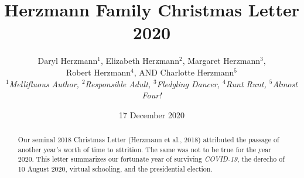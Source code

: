 \documentclass[letterpaper,11pt]{article}
\title{\vspace{-2.0cm}Herzmann Family Christmas Letter 2020}
\author{Daryl Herzmann${}^1$, Elizabeth Herzmann${}^2$, Margaret 
Herzmann${}^3$,\\
Robert Herzmann${}^4$, AND Charlotte Herzmann${}^5$ \\
\it{${}^1$Mellifluous Author},
\it{${}^2$Responsible Adult},
\it{${}^3$Fledgling Dancer},
\it{${}^4$Runt Runt},
\it{${}^5$Almost Four!}}
\date{17 December 2020}
\begin{document}
\maketitle
\vspace{-0.75cm}
\begin{abstract}
Our seminal 2018 Christmas Letter (Herzmann et al., 2018) attributed the passage
of another year's worth of time to attrition.  The same was not to be true for the
year 2020.  This letter summarizes our fortunate year of surviving \textit{COVID-19},
the derecho of 10 August 2020, virtual schooling, and the presidential election.
\end{abstract}

\vspace{-0.5cm}

\noindent\makebox[\linewidth]{\rule{\textwidth}{1pt}}
\end{document}
